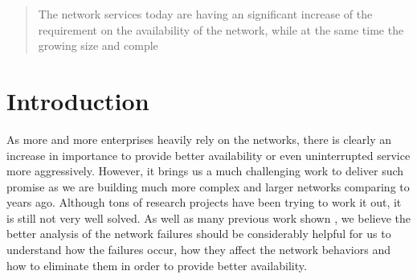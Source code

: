 \documentclass[conference, twocolumn, oneside, 10pt]{IEEEtran}
\begin{document}




\maketitle
\thispagestyle{plain}
\pagestyle{plain}

\begin{abstract}

\end{abstract}





%
\IEEEpeerreviewmaketitle


\begin{abstract}

The network services today are having an significant increase of the requirement on the availability of the network, while at the same time the growing size and comple 

\end{abstract}

\section{Introduction}
\label{sec:sec1}

As more and more enterprises heavily rely on the networks, there is clearly an increase in importance to provide better availability or even uninterrupted service more aggressively. However, it brings us a much challenging work to deliver such promise as we are building much more complex and larger networks comparing to years ago. Although tons of research projects have been trying to work it out, it is still not very well solved. As well as many previous work shown \cite{labovitz1999experimental, markopoulou2008characterization, padmanabhan2006study}, we believe the better analysis of the network failures should be considerably helpful for us to understand how the failures occur, how they affect the network behaviors and how to eliminate them in order to provide better availability.
\end{document}
